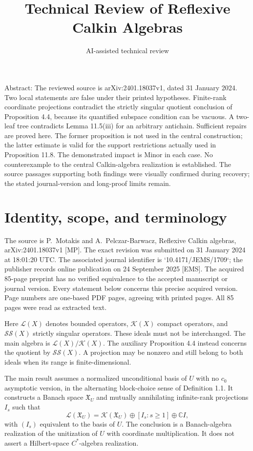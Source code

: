 \documentclass[10pt]{article}
\title{Technical Review of
Reflexive Calkin Algebras}
\author{AI-assisted technical review}
\date{}
\begin{document}
\maketitle
Abstract: The reviewed source is arXiv:2401.18037v1, dated 31 January 2024. Two local statements are false under their printed hypotheses. Finite-rank coordinate projections contradict the strictly singular quotient conclusion of Proposition 4.4, because its quantified subspace condition can be vacuous. A two-leaf tree contradicts Lemma 11.5(iii) for an arbitrary antichain. Sufficient repairs are proved here. The former proposition is not used in the central construction; the latter estimate is valid for the support restrictions actually used in Proposition 11.8. The demonstrated impact is Minor in each case. No counterexample to the central Calkin-algebra realization is established. The source passages supporting both findings were visually confirmed during recovery; the stated journal-version and long-proof limits remain.\par
\section*{Identity, scope, and terminology}
The source is P. Motakis and A. Pelczar-Barwacz, Reflexive Calkin algebras, arXiv:2401.18037v1 [MP]. The exact revision was submitted on 31 January 2024 at 18:01:20 UTC. The associated journal identifier is `10.4171/JEMS/1709`; the publisher records online publication on 24 September 2025 [EMS]. The acquired 85-page preprint has no verified equivalence to the accepted manuscript or journal version. Every statement below concerns this precise acquired version. Page numbers are one-based PDF pages, agreeing with printed pages. All 85 pages were read as extracted text.\par
Here \(\mathcal L(X)\) denotes bounded operators, \(\mathcal K(X)\) compact operators, and \(\mathcal{SS}(X)\) strictly singular operators. These ideals must not be interchanged. The main algebra is \(\mathcal L(X)/\mathcal K(X)\). The auxiliary Proposition 4.4 instead concerns the quotient by \(\mathcal{SS}(X)\). A projection may be nonzero and still belong to both ideals when its range is finite-dimensional.\par
The main result assumes a normalized unconditional basis of \(U\) with no \(c_0\) asymptotic version, in the alternating block-choice sense of Definition 1.1. It constructs a Banach space \(\mathfrak X_U\) and mutually annihilating infinite-rank projections \(I_s\) such that \[\mathcal L(\mathfrak X_U)
 =\mathcal K(\mathfrak X_U)\oplus[I_s:s\geq1]\oplus\mathbb CI,\] with \((I_s)\) equivalent to the basis of \(U\). The conclusion is a Banach-algebra realization of the unitization of \(U\) with coordinate multiplication. It does not assert a Hilbert-space \(C^*\)-algebra realization.\par
\end{document}
